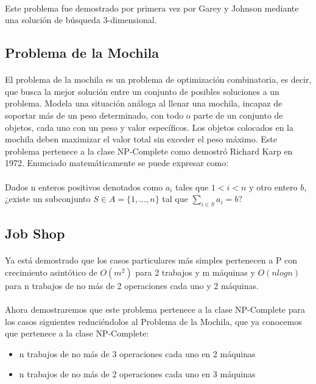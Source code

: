 \documentclass[11pt, a4paper,spanish]{article}
\begin{document}
				\paragraph{}
				Este problema fue demostrado por primera vez por Garey y Johnson mediante una solución de búsqueda 3-dimensional.
		
			\subsection{Problema de la Mochila}
				
				\paragraph{}
				El problema de la mochila es un problema de optimización combinatoria, es decir, que busca la mejor solución entre un conjunto de posibles soluciones a un problema. Modela una situación análoga al llenar una mochila, incapaz de soportar más de un peso determinado, con todo o parte de un conjunto de objetos, cada uno con un peso y valor específicos. Los objetos colocados en la mochila deben maximizar el valor total sin exceder el peso máximo. Este problema pertenece a la clase NP-Complete como demostró  Richard Karp en 1972. Enunciado matemáticamente se puede expresar como: 
				
				\paragraph{}
				Dados n enteros positivos denotados como $a_{i}$ tales que $1 < i < n$ y otro entero $b$, ¿existe un subconjunto $S \in A = \{1,...,n\} $ tal que $\sum_{i\in S}a_{i}= b$?
				
				
				
			\subsection{Job Shop}
			
				\paragraph{}
				 Ya está demostrado que los casos particulares más simples pertenecen a P con crecimiento asintótico de $O(m^2)$ para 2 trabajos y m máquinas y $O(n logn)$ para n trabajos de no más de 2 operaciones cada uno y 2 máquinas. 
				 
				\paragraph{}
				 Ahora demostraremos que este problema pertenece a la clase NP-Complete para los casos siguientes reduciéndolos al Problema de la Mochila, que ya conocemos que pertenece a la clase NP-Complete:
				 \begin{itemize}
				 	\item n trabajos de no más de 3 operaciones cada uno en 2 máquinas
				 	\item n trabajos de no más de 2 operaciones cada uno en 3 máquinas
				 \end {itemize}
\end{document}
